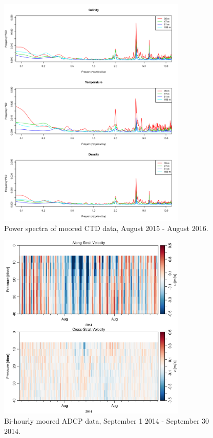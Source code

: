 \documentclass[12pt]{dforeport}
\begin{document}
\begin{figure}  
\centering
\includegraphics[width = 0.8\textwidth]{./figures/14_mctd_ps_2015_2016.png}
\caption[Power spectra of moored CTD, 2015-2016]{Power spectra of moored CTD data, August 2015 - August 2016.}
\label{f:mctd_ps_2015_2016}
\end{figure}



\begin{figure}  
\centering
\includegraphics[width = 0.8\textwidth]{./figures/15_madcp_2014.png}
\caption[Bi-hourly ADCP data, Sept. 1 - Sept 20, 2014]{Bi-hourly moored ADCP data, September 1 2014 - September 30 2014.}
\label{f:madcp_sept2014}
\end{figure}
\end{document}
